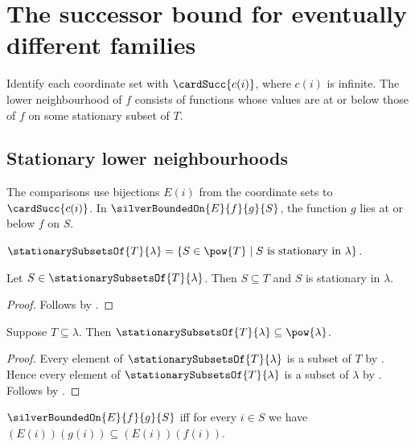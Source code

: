 \section{The successor bound for eventually different families}



Identify each coordinate set with $\cardSucc{c(i)}$, where $c(i)$ is
infinite. The lower neighbourhood of $f$ consists of functions whose values
are at or below those of $f$ on some stationary subset of $T$.

\subsection{Stationary lower neighbourhoods}

The comparisons use bijections $E(i)$ from the coordinate sets to
$\cardSucc{c(i)}$.
In $\silverBoundedOn{E}{f}{g}{S}$, the function $g$ lies at or below $f$ on $S$.

\begin{definition}\label{stationary_subsets_of}
    $\stationarySubsetsOf{T}{\lambda}
        =\{S\in\pow{T}\mid
            \text{$S$ is stationary in $\lambda$}\}$.
\end{definition}

\begin{proposition}\label{stationary_subsets_of_elim}
    Let $S\in\stationarySubsetsOf{T}{\lambda}$.
    Then $S\subseteq T$ and $S$ is stationary in $\lambda$.
\end{proposition}
\begin{proof}
    Follows by .
\end{proof}

\begin{proposition}\label{stationary_subsets_of_subseteq_powerset}
    Suppose $T\subseteq\lambda$.
    Then $\stationarySubsetsOf{T}{\lambda}\subseteq\pow{\lambda}$.
\end{proposition}
\begin{proof}
    Every element of $\stationarySubsetsOf{T}{\lambda}$ is a subset of $T$
        by .
    Hence every element of $\stationarySubsetsOf{T}{\lambda}$
        is a subset of $\lambda$ by .
    Follows by .
\end{proof}

\begin{definition}\label{silver_bounded_on}
    $\silverBoundedOn{E}{f}{g}{S}$ iff
        for every $i\in S$ we have
            $(E(i))(g(i))\subseteq(E(i))(f(i))$.
\end{definition}


